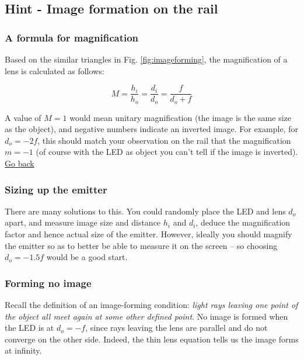 \documentclass[a4paper]{report}
\begin{document}
    \clearpage

    \subsection{Hint - Image formation on the rail}
	\hypertarget{hintTo-image}{}

    \subsubsection{A formula for magnification}
	Based on the similar triangles in Fig. \ref{fig:imageforming}, the magnification of a lens is calculated as follows:

	\begin{equation}
	M = \frac{h_i}{h_o} = \frac{d_i}{d_o} = \frac{f}{d_o+f}
	\label{eq:mag}
	\end{equation}

	A value of $M=1$ would mean unitary magnification (the image is the same size as the object), and negative numbers indicate an inverted image.
	For example, for $d_o=-2f$, this should match your observation on the rail that the magnification $m=-1$ (of course with the LED as object you can't tell if the image is inverted).
	\\
	\hyperlink{hintBack-image}{Go back}

	\subsubsection{Sizing up the emitter}
	There are many solutions to this.
	You could randomly place the LED and lens $d_o$ apart, and measure image size and distance $h_i$ and $d_i$, deduce the magnification factor and hence actual size of the emitter.
	However, ideally you should magnify the emitter so as to better be able to measure it on the screen -- so choosing $d_o=-1.5f$ would be a good start.



	\subsubsection{Forming no image}
	Recall the definition of an image-forming condition: \emph{light rays leaving one point of the object all meet again at some other defined point}.
	No image is formed when the LED is at $d_o=-f$, since rays leaving the lens are parallel and do not converge on the other side.
	Indeed, the thin lens equation tells us the image forms at infinity.
\end{document}
